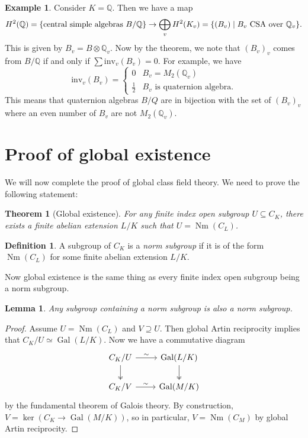 \documentclass[leqno, openany]{memoir}
\newtheorem{lem}[thm]{Lemma}
\theoremstyle{definition}
\newtheorem{defn}[thm]{Definition}
\newtheorem{exm}[thm]{Example}
\theoremstyle{remark}
\theoremstyle{plain}
\newtheorem*{thm*}{Theorem}
\theoremstyle{definition}
\theoremstyle{remark}
\newcommand{\Q}{\mathbb{Q}}
\newcommand{\mr}[1]{\mathrm{#1}}
\DeclareMathOperator{\Gal}{Gal}
\DeclareMathOperator{\Nm}{Nm}
\begin{document}
\begin{exm}
    Consider $K = \Q$. Then we have a map
    \[ H^2(\Q) = \qty{\text{central simple algebras }B/\Q} \to \bigoplus_v H^2(K_v) = \qty{(B_v) \mid B_v\text{ CSA over } \Q_v}. \]
    This is given by $B_v = B \otimes \Q_v$. Now by the theorem, we note that ${(B_v)}_v$ comes from $B/\Q$ if and only if $\sum \mr{inv}_v(B_v) = 0$. For example, we have
    \[ \mr{inv}_v(B_v) = \begin{cases}
        0 & B_v = M_2(\Q_v) \\
        \frac{1}{2} & B_v \text{ is quaternion algebra}.
    \end{cases} \]
    This means that quaternion algebras $B/Q$ are in bijection with the set of ${(B_v)}_v$ where an even number of $B_v$ are not $M_2(\Q_v)$.
\end{exm}

\section{Proof of global existence}%
\label{sec:proof_of_global_existence}

We will now complete the proof of global class field theory. We need to prove the following statement:
\begin{thm*}[Global existence]
    For any finite index open subgroup $U \subseteq C_K$, there exists a finite abelian extension $L/K$ such that $U = \Nm(C_L)$.
\end{thm*}

\begin{defn}
    A subgroup of $C_K$ is a \textit{norm subgroup} if it is of the form $\Nm(C_L)$ for some finite abelian extension $L/K$.
\end{defn}

Now global existence is the same thing as every finite index open subgroup being a norm subgroup. 

\begin{lem}
    Any subgroup containing a norm subgroup is also a norm subgroup.
\end{lem}

\begin{proof}
    Assume $U = \Nm(C_L)$ and $V \supseteq U$. Then global Artin reciprocity implies that $C_K/U \simeq \Gal(L/K)$. Now we have a commutative diagram
    \begin{equation*}
    \begin{tikzcd}
        C_K/U \ar{r}{\sim} \ar[twoheadrightarrow]{d} & \Gal(L/K) \ar[twoheadrightarrow]{d} \\
        C_K/V \ar{r}{\sim} & \Gal(M/K)
    \end{tikzcd}
    \end{equation*}
    by the fundamental theorem of Galois theory. By construction, $V = \ker(C_K \to \Gal(M/K))$, so in particular, $V = \Nm(C_M)$ by global Artin reciprocity.
\end{proof}
\end{document}
